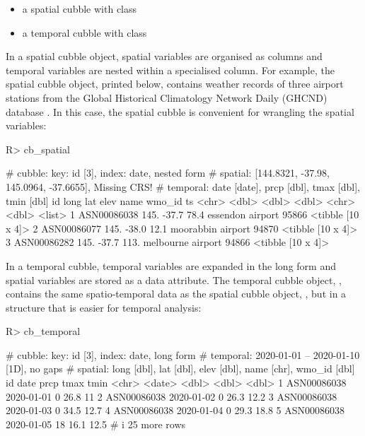 \documentclass[
  shortnames]{jss}
\providecommand{\tightlist}{%
  \setlength{\itemsep}{0pt}\setlength{\parskip}{0pt}}
\begin{document}
\begin{itemize}
\tightlist
\item
  a spatial cubble with class 
\item
  a temporal cubble with class 
\end{itemize}

In a spatial cubble object, spatial variables are organised as columns and temporal variables are nested within a specialised  column. For example, the spatial cubble object,  printed below, contains weather records of three airport stations from the Global Historical Climatology Network Daily (GHCND) database \citep{menne2012overview}. In this case, the spatial cubble is convenient for wrangling the spatial variables:

\begin{CodeChunk}
\begin{CodeInput}
R> cb_spatial
\end{CodeInput}
\begin{CodeOutput}
# cubble:   key: id [3], index: date, nested form
# spatial:  [144.8321, -37.98, 145.0964, -37.6655], Missing CRS!
# temporal: date [date], prcp [dbl], tmax [dbl], tmin [dbl]
  id           long   lat  elev name              wmo_id ts               
  <chr>       <dbl> <dbl> <dbl> <chr>              <dbl> <list>           
1 ASN00086038  145. -37.7  78.4 essendon airport   95866 <tibble [10 x 4]>
2 ASN00086077  145. -38.0  12.1 moorabbin airport  94870 <tibble [10 x 4]>
3 ASN00086282  145. -37.7 113.  melbourne airport  94866 <tibble [10 x 4]>
\end{CodeOutput}
\end{CodeChunk}

In a temporal cubble, temporal variables are expanded in the long form and spatial variables are stored as a data attribute. The temporal cubble object, , contains the same spatio-temporal data as the spatial cubble object, , but in a structure that is easier for temporal analysis:

\begin{CodeChunk}
\begin{CodeInput}
R> cb_temporal
\end{CodeInput}
\begin{CodeOutput}
# cubble:   key: id [3], index: date, long form
# temporal: 2020-01-01 -- 2020-01-10 [1D], no gaps
# spatial:  long [dbl], lat [dbl], elev [dbl], name [chr], wmo_id [dbl]
  id          date        prcp  tmax  tmin
  <chr>       <date>     <dbl> <dbl> <dbl>
1 ASN00086038 2020-01-01     0  26.8  11  
2 ASN00086038 2020-01-02     0  26.3  12.2
3 ASN00086038 2020-01-03     0  34.5  12.7
4 ASN00086038 2020-01-04     0  29.3  18.8
5 ASN00086038 2020-01-05    18  16.1  12.5
# i 25 more rows
\end{CodeOutput}
\end{CodeChunk}
\end{document}
